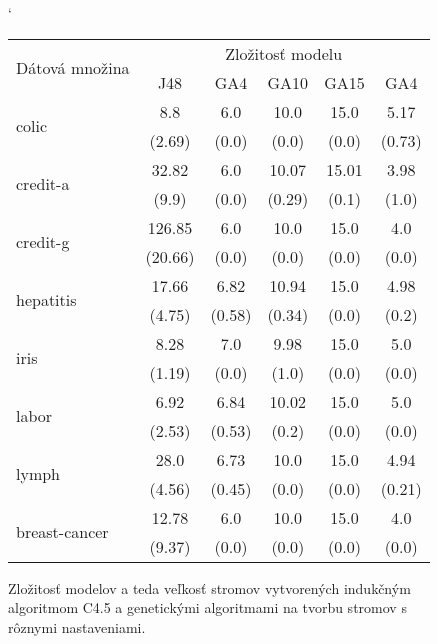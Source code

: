 \begin{figure}[h]
\catcode`
\centering 
\newcommand\T{\rule{0pt}{2.6ex}}       %
\newcommand\B{\rule[-1.2ex]{0pt}{0pt}} %
\begin{tabular}{|l||c|c|c|c|c||}
\hline \multirow{2}{*}{Dátová množina} & \multicolumn{5}{|c||}{Zložitosť modelu} \\ 
\cline{2-6} & J48 & GA4 & GA10 & GA15 & GA4 \\
\hline
\hline \multirow{2}{*}{colic} & 8.8 & 6.0 & 10.0 & 15.0 & 5.17 \T\\[-1.5ex]
& \tiny (2.69) & \tiny (0.0) & \tiny (0.0) & \tiny (0.0) & \tiny (0.73)\B\\
\hline \multirow{2}{*}{credit-a} & 32.82 & 6.0 & 10.07 & 15.01 & 3.98 \T\\[-1.5ex]
& \tiny (9.9) & \tiny (0.0) & \tiny (0.29) & \tiny (0.1) & \tiny (1.0)\B\\
\hline \multirow{2}{*}{credit-g} & 126.85 & 6.0 & 10.0 & 15.0 & 4.0\T\\[-1.5ex]
& \tiny (20.66) & \tiny (0.0) & \tiny (0.0) & \tiny (0.0) & \tiny (0.0)\B\\
\hline \multirow{2}{*}{hepatitis} & 17.66 & 6.82 & 10.94 & 15.0 & 4.98 \T\\[-1.5ex]
& \tiny (4.75) & \tiny (0.58) & \tiny (0.34) & \tiny (0.0) & \tiny (0.2)\B\\
\hline \multirow{2}{*}{iris} & 8.28 & 7.0 & 9.98 & 15.0 & 5.0 \T\\[-1.5ex]
& \tiny (1.19) & \tiny (0.0) & \tiny (1.0) & \tiny (0.0) & \tiny (0.0)\B\\
\hline \multirow{2}{*}{labor} & 6.92 & 6.84 & 10.02 & 15.0 & 5.0 \T\\[-1.5ex]
& \tiny (2.53) & \tiny (0.53) & \tiny (0.2) & \tiny (0.0) & \tiny (0.0)\B\\
\hline \multirow{2}{*}{lymph} & 28.0 & 6.73 & 10.0 & 15.0 & 4.94 \T\\[-1.5ex]
& \tiny (4.56) & \tiny (0.45) & \tiny (0.0) & \tiny (0.0) & \tiny (0.21)\B\\
\hline \multirow{2}{*}{breast-cancer} & 12.78 & 6.0 & 10.0 & 15.0 & 4.0 \T\\[-1.5ex]
& \tiny (9.37) & \tiny (0.0) & \tiny (0.0) & \tiny (0.0) & \tiny (0.0)\B\\
\hline
\end{tabular}
\caption{Zložitosť modelov a teda veľkosť stromov vytvorených indukčným algoritmom C4.5 a genetickými algoritmami na tvorbu stromov s rôznymi nastaveniami.}\label{fig:size}
\end{figure}